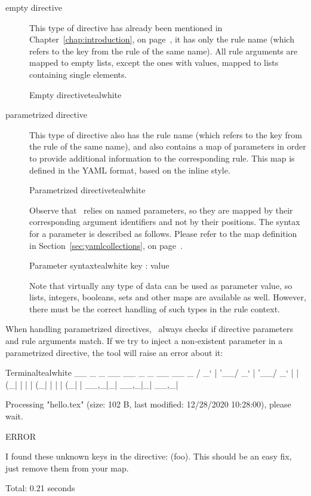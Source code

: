 \begin{description}
\item[empty directive] This type of directive has already been mentioned in Chapter~\ref{chap:introduction}, on page~\pageref{chap:introduction}, it has only the rule name (which refers to the  key from the rule of the same name). All rule arguments are mapped to empty lists, except the ones with  values, mapped to lists containing single elements.

\begin{codebox}{Empty directive}{teal}{\icnote}{white}
\end{codebox}

\item[parametrized directive] This type of directive also has the rule name (which refers to the  key from the rule of the same name), and also contains a map of parameters in order to provide additional information to the corresponding rule. This map is defined in the YAML format, based on the inline style.

\begin{codebox}{Parametrized directive}{teal}{\icnote}{white}
\end{codebox}

Observe that \arara\ relies on named parameters, so they are mapped by their corresponding argument identifiers and not by their positions. The syntax for a parameter is described as follows. Please refer to the map definition in Section~\ref{sec:yamlcollections}, on page~\pageref{sec:yamlcollections}.

\begin{codebox}{Parameter syntax}{teal}{\icnote}{white}
key : value
\end{codebox}

Note that virtually any type of data can be used as parameter value, so lists, integers, booleans, sets and other maps are available as well. However, there must be the correct handling of such types in the rule context.
\end{description}

When handling parametrized directives, \arara\ always checks if directive parameters and rule arguments match. If we try to inject a non-existent parameter in a parametrized directive, the tool will raise an error about it:

\begin{codebox}{Terminal}{teal}{\icnote}{white}
  __ _ _ __ __ _ _ __ __ _
 / _` | '__/ _` | '__/ _` |
| (_| | | | (_| | | | (_| |
 \__,_|_|  \__,_|_|  \__,_|

Processing "hello.tex" (size: 102 B, last modified: 12/28/2020
10:28:00), please wait.

  ERROR

I found these unknown keys in the directive: (foo). This should
be an easy fix, just remove them from your map.

Total: 0.21 seconds
\end{codebox}

